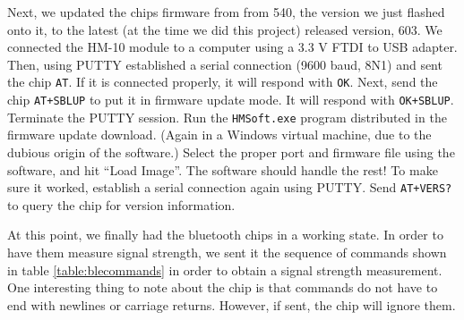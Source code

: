 \documentclass[]{article}
\begin{document}
Next, we updated the chips firmware from from 540, the version we just flashed onto it, to the latest (at the time we did this project) released version, 603. \cite{jnhuamao603}
We connected the HM-10 module to a computer using a 3.3 V FTDI to USB adapter.
Then, using PUTTY established a serial connection (9600 baud, 8N1) and sent the chip \texttt{AT}. If it is connected properly, it will respond with \texttt{OK}.
Next, send the chip \texttt{AT+SBLUP} to put it in firmware update mode.
It will respond with \texttt{OK+SBLUP}. Terminate the PUTTY session.
Run the \texttt{HMSoft.exe} program distributed in the firmware update download.
(Again in a Windows virtual machine, due to the dubious origin of the software.)
Select the proper port and firmware file using the software, and hit ``Load Image''.
The software should handle the rest!
To make sure it worked, establish a serial connection again using PUTTY.
Send \texttt{AT+VERS?} to query the chip for version information.


At this point, we finally had the bluetooth chips in a working state.
In order to have them measure signal strength, we sent it the sequence of commands
shown in table \ref{table:blecommands} in order to obtain a signal strength measurement.
One interesting thing to note about the chip is that commands do not have to end with newlines or carriage returns.
However, if sent, the chip will ignore them.
\end{document}
